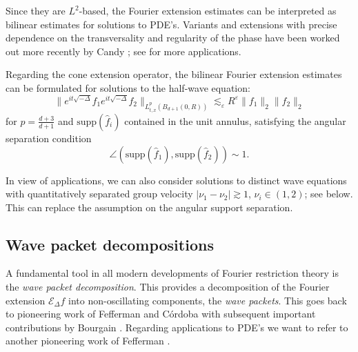 \documentclass{amsart}
\theoremstyle{definition}
\begin{document}
\smallskip

Since they are $L^2$-based, the Fourier extension estimates  can be interpreted as bilinear estimates for solutions to PDE's. Variants and extensions with precise dependence on the transversality and regularity of the phase have been worked out more recently by Candy \cite{Candy2019};
see \cite{CandyHerr2018,CandyHerr2018II,CandyHerr2018III} for more applications.

\smallskip

Regarding the cone extension operator, the bilinear Fourier extension estimates can be formulated for
solutions to the half-wave equation:
\begin{equation}
\label{eq:BilinearEstimateEuclideanHalfwaves}
\| e^{it \sqrt{-\Delta}} f_1 e^{it \sqrt{-\Delta}} f_2 \|_{L^p_{t,x}(B_{d+1}(0,R))} \lesssim_\varepsilon R^\varepsilon \| f_1 \|_2 \| f_2 \|_2
\end{equation}
for $p=\frac{d+3}{d+1}$ and $\text{supp}(\hat{f}_i)$ contained in the unit annulus, satisfying the angular separation condition
\begin{equation*}
\angle (\text{supp}(\hat{f}_1),\text{supp}(\hat{f}_2)) \sim 1.
\end{equation*} 

In view of applications, we can also consider solutions to distinct wave equations with quantitatively separated group velocity $|\nu_1 - \nu_2 | \gtrsim 1$, $\nu_i \in (1,2)$; see below. This can replace the assumption on the angular support separation. 

\subsection{Wave packet decompositions}

A fundamental tool in all modern developments of Fourier restriction theory is the \emph{wave packet decomposition}. This provides a decomposition of the Fourier extension $\mathcal{E}_{\Delta} f$ into non-oscillating components, the \emph{wave packets}. This goes back to pioneering work of Fefferman \cite{Fefferman1973} and C\'ordoba \cite{Cordoba1979} with subsequent important contributions by Bourgain \cite{Bourgain1991I,Bourgain1991II,Bourgain1995}. Regarding applications to PDE's we want to refer to another pioneering work of Fefferman \cite{Fefferman1983}.

\smallskip
\end{document}
